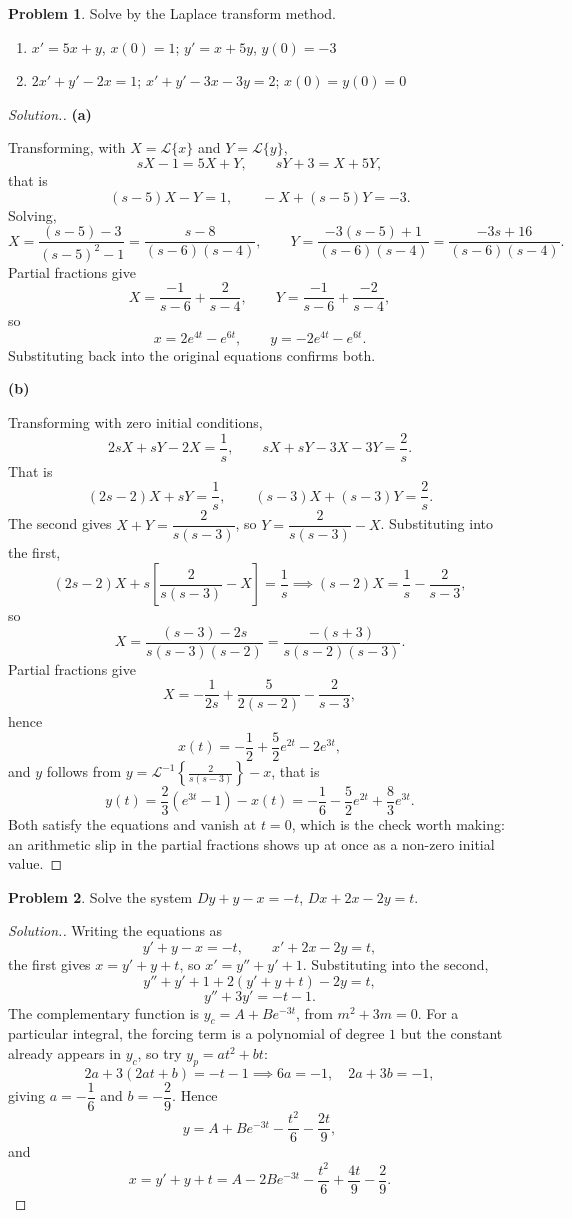 \documentclass[11pt,a4paper]{article}
\theoremstyle{definition}
\newtheorem{problemx}{Problem}[subsection]
\newenvironment{problem}{\begin{problemx}}{\end{problemx}}
\newenvironment{solution}
  {\renewcommand{\qedsymbol}{}\begin{proof}[\textit{Solution}.]}
  {\end{proof}}
\newcommand{\subhead}[1]{%
  \par\medskip\noindent\textbf{#1}\par\nobreak\smallskip}
\begin{document}
\begin{problem}
Solve by the Laplace transform method.
\begin{enumerate}
\item[(a)] $x' = 5x+y$, $x(0)=1$; $y' = x+5y$, $y(0)=-3$
\item[(b)] $2x'+y'-2x = 1$; $x'+y'-3x-3y = 2$; $x(0)=y(0)=0$
\end{enumerate}
\end{problem}
\begin{solution}
\subhead{(a)}
Transforming, with $X = \mathcal{L}\{x\}$ and $Y = \mathcal{L}\{y\}$,
\[sX-1 = 5X+Y,\qquad sY+3 = X+5Y ,\]
that is
\[(s-5)X - Y = 1,\qquad -X + (s-5)Y = -3 .\]
Solving,
\[X = \frac{(s-5)-3}{(s-5)^2-1} = \frac{s-8}{(s-6)(s-4)},\qquad
Y = \frac{-3(s-5)+1}{(s-6)(s-4)} = \frac{-3s+16}{(s-6)(s-4)}.\]
Partial fractions give
\[X = \frac{-1}{s-6} + \frac{2}{s-4},\qquad
Y = \frac{-1}{s-6} + \frac{-2}{s-4},\]
so
\[x = 2e^{4t}-e^{6t},\qquad y = -2e^{4t}-e^{6t}.\]
Substituting back into the original equations confirms both.

\subhead{(b)}
Transforming with zero initial conditions,
\[2sX + sY - 2X = \frac1s,\qquad sX+sY-3X-3Y = \frac2s .\]
That is
\[(2s-2)X + sY = \frac1s,\qquad (s-3)X + (s-3)Y = \frac2s .\]
The second gives $X+Y = \dfrac{2}{s(s-3)}$, so $Y = \dfrac{2}{s(s-3)} - X$.
Substituting into the first,
\[(2s-2)X + s\left[\frac{2}{s(s-3)}-X\right] = \frac1s
\implies (s-2)X = \frac1s - \frac{2}{s-3},\]
so
\[X = \frac{(s-3)-2s}{s(s-3)(s-2)} = \frac{-(s+3)}{s(s-2)(s-3)} .\]
Partial fractions give
\[X = -\frac{1}{2s} + \frac{5}{2(s-2)} - \frac{2}{s-3},\]
hence
\[x(t) = -\frac12 + \frac52e^{2t} - 2e^{3t},\]
and $y$ follows from $y = \displaystyle\mathcal{L}^{-1}\left\{\frac{2}{s(s-3)}\right\} - x$,
that is
\[y(t) = \frac23(e^{3t}-1) - x(t)
= -\frac16 - \frac52e^{2t} + \frac83e^{3t}.\]
Both satisfy the equations and vanish at $t=0$, which is the check worth
making: an arithmetic slip in the partial fractions shows up at once as a
non-zero initial value.
\end{solution}

\begin{problem}
Solve the system $Dy+y-x = -t$, $Dx+2x-2y = t$.
\end{problem}
\begin{solution}
Writing the equations as
\[y'+y-x = -t,\qquad x'+2x-2y = t ,\]
the first gives $x = y'+y+t$, so $x' = y''+y'+1$. Substituting into the second,
\[y''+y'+1 + 2(y'+y+t) - 2y = t ,\]
\[y'' + 3y' = -t - 1 .\]
The complementary function is $y_c = A + Be^{-3t}$, from $m^2+3m = 0$. For a
particular integral, the forcing term is a polynomial of degree $1$ but the
constant already appears in $y_c$, so try $y_p = at^2+bt$:
\[2a + 3(2at+b) = -t-1 \implies 6a = -1,\quad 2a+3b = -1 ,\]
giving $a = -\dfrac16$ and $b = -\dfrac{2}{9}$. Hence
\[y = A + Be^{-3t} - \frac{t^2}{6} - \frac{2t}{9},\]
and
\[x = y'+y+t = A - 2Be^{-3t} - \frac{t^2}{6} + \frac{4t}{9} - \frac{2}{9}.\]
\end{solution}
\end{document}
